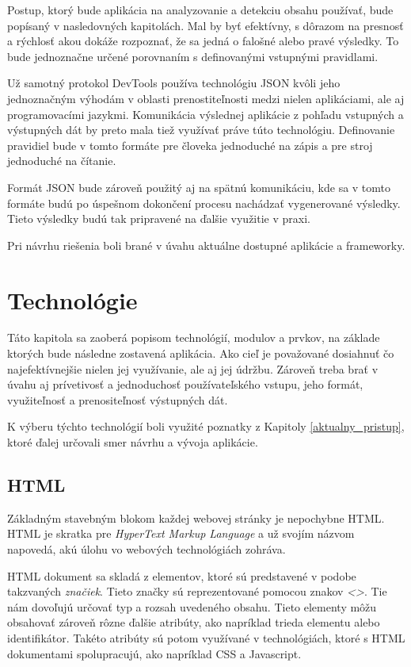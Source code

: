 Postup, ktorý bude aplikácia na analyzovanie a detekciu obsahu používať, bude popísaný v nasledovných kapitolách. Mal by byť efektívny, s dôrazom na presnosť a rýchlosť akou dokáže rozpoznať, že sa jedná o falošné alebo pravé výsledky. To bude jednoznačne určené porovnaním s definovanými vstupnými pravidlami.

\bigskip

Už samotný protokol DevTools používa technológiu JSON kvôli jeho jednoznačným výhodám v oblasti prenostiteľnosti medzi nielen aplikáciami, ale aj programovacími jazykmi. Komunikácia výslednej aplikácie z pohľadu vstupných a výstupných dát by preto mala tiež využívať práve túto technológiu. Definovanie pravidiel bude v tomto formáte pre človeka jednoduché na zápis a pre stroj jednoduché na čítanie. 

Formát JSON bude zároveň použitý aj na spätnú komunikáciu, kde sa v tomto formáte budú po úspešnom dokončení procesu nachádzať vygenerované výsledky. Tieto výsledky budú tak pripravené na ďalšie využitie v praxi.

Pri návrhu riešenia boli brané v úvahu aktuálne dostupné aplikácie a frameworky. 


\chapter{Technológie}
\label{Technologie}

Táto kapitola sa zaoberá popisom technológií, modulov a prvkov, na základe ktorých bude následne zostavená aplikácia. Ako cieľ je považované dosiahnuť čo najefektívnejšie nielen jej využívanie, ale aj jej údržbu. Zároveň treba brať v úvahu aj prívetivosť a jednoduchosť používateľského vstupu, jeho formát, využiteľnosť a prenositeľnosť výstupných dát. 

K výberu týchto technológií boli využité poznatky z Kapitoly \ref{aktualny_pristup}, ktoré ďalej určovali smer návrhu a vývoja aplikácie.

\section{HTML}

Základným stavebným blokom každej webovej stránky je nepochybne HTML. HTML je skratka pre \textit{HyperText Markup Language} a už svojím názvom napovedá, akú úlohu vo webových technológiách zohráva. 

HTML dokument sa skladá z elementov, ktoré sú predstavené v podobe takzvaných \textit{značiek}. Tieto značky sú reprezentované pomocou znakov \textit{<>}. Tie nám dovoľujú určovať typ a rozsah uvedeného obsahu. Tieto elementy môžu obsahovať zároveň rôzne ďalšie atribúty, ako napríklad trieda elementu alebo identifikátor. Takéto atribúty sú potom využívané v technológiách, ktoré s HTML dokumentami spolupracujú, ako napríklad CSS a Javascript.

